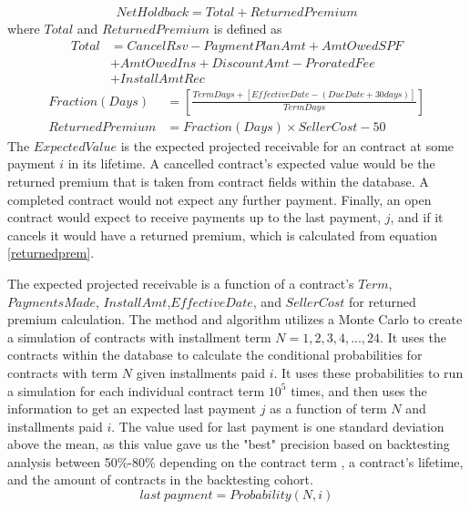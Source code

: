 \documentclass[titlepage]{article}
\begin{document}
\begin{equation}
\begin{split}
NetHoldback = Total + ReturnedPremium
\end{split}
\end{equation}
where $Total$ and $ReturnedPremium$ is defined as
\begin{equation}
	\begin{split}
	Total &= CancelRsv - PaymentPlanAmt + AmtOwedSPF\\
	&+ AmtOwedIns + DiscountAmt - ProratedFee\\
	&+ InstallAmtRec 
	\end{split}
\end{equation}
\begin{equation}
\begin{split}\label{returnedprem}
Fraction(Days) &= \left[\frac{TermDays + \left[EffectiveDate - (DueDate + 30 days)\right]}{TermDays}\right]\\
ReturnedPremium &= Fraction(Days) \times SellerCost - 50
\end{split}
\end{equation}
The $ExpectedValue$ is the expected projected receivable for an contract at some payment $i$ in its lifetime. A cancelled contract's expected value would be the returned premium that is taken from contract fields within the database. A completed contract would not expect any further payment. Finally, an open contract would expect to receive payments up to the last payment, $j$, and if it cancels it would have a returned premium, which is calculated from equation \ref{returnedprem}. 

The expected projected receivable is a function of a contract's $Term$, $PaymentsMade$, $InstallAmt$,$EffectiveDate$, and $SellerCost$ for returned premium calculation. The method and algorithm utilizes a Monte Carlo to create a simulation of contracts with installment term $N = 1,2,3,4,...,24$. It uses the contracts within the database to calculate the conditional probabilities for contracts with term $N$ given installments paid $i$. It uses these probabilities to run a simulation for each individual contract term $10^5$ times, and then uses the information to get an expected last payment $j$ as a function of term $N$ and installments paid $i$. The value used for last payment is one standard deviation above the mean, as this value gave us the "best" precision based on backtesting analysis between 50\%-80\% depending on the contract term , a contract's lifetime, and the amount of contracts in the backtesting cohort. 
\begin{equation}
last\ payment= Probability(N,i)
\end{equation}
\end{document}
